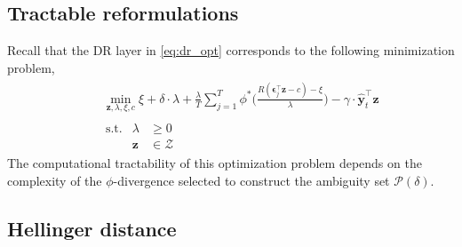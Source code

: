 \documentclass[10pt, twocolumn]{article}
\theoremstyle{plain}
\theoremstyle{definition}
\begin{document}
\begin{appendices}
\section{Tractable reformulations}\label{app:reform}


Recall that the DR layer in \eqref{eq:dr_opt} corresponds to the 
following minimization problem,
\[
\begin{aligned}
	&\begin{aligned}
	&\min_{\bm{z}, \lambda, \xi, c} \xi + \delta\cdot \lambda + \frac{\lambda}{T} 
	\sum_{j=1}^T \phi^*\bigg(\frac{R(\bm{\epsilon}_j^\top \bm{z} - c) - 
	\xi}{\lambda}\bigg) - \gamma \cdot \hat{\bm{y}}_{t}^\top \bm{z}
	\end{aligned}\\
	&\begin{aligned}
	&\ \text{s.t.} & \lambda &\geq 0\\
	&& \bm{z} &\in\mathcal{Z}
	\end{aligned}	
\end{aligned}
\]
The computational tractability of this optimization problem depends on the 
complexity of the \(\phi\)-divergence selected to construct the ambiguity 
set \(\mathcal{P}(\delta)\).


\subsection{Hellinger distance}



\end{appendices}
\end{document}
